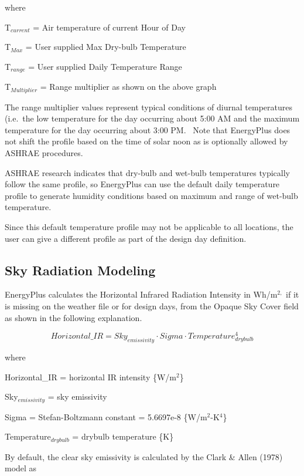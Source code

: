 where

T\(_{current}\) = Air temperature of current Hour of Day

T\(_{Max}\) = User supplied Max Dry-bulb Temperature

T\(_{range}\) = User supplied Daily Temperature Range

T\(_{Multiplier}\) = Range multiplier as shown on the above graph

The range multiplier values represent typical conditions of diurnal temperatures (i.e.~the low temperature for the day occurring about 5:00 AM and the maximum temperature for the day occurring about 3:00 PM.~ Note that EnergyPlus does not shift the profile based on the time of solar noon as is optionally allowed by ASHRAE procedures.

ASHRAE research indicates that dry-bulb and wet-bulb temperatures typically follow the same profile, so EnergyPlus can use the default daily temperature profile to generate humidity conditions based on maximum and range of wet-bulb temperature.

Since this default temperature profile may not be applicable to all locations, the user can give a different profile as part of the design day definition.

\subsection{Sky Radiation Modeling}\label{sky-radiation-modeling}

EnergyPlus calculates the Horizontal Infrared Radiation Intensity in Wh/m\(^{2,}\) if it is missing on the weather file or for design days, from the Opaque Sky Cover field as shown in the following explanation.

\begin{equation}
Horizontal\_IR = Sk{y_{emissivity}}\cdot Sigma\cdot Temperature_{drybulb}^4
\end{equation}

where

Horizontal\_IR = horizontal IR intensity \{W/m\(^{2}\)\}

Sky\(_{emissivity}\) = sky emissivity

Sigma = Stefan-Boltzmann constant = 5.6697e-8 \{W/m\(^{2}\)-K\(^{4}\)\}

Temperature\(_{drybulb}\) = drybulb temperature \{K\}

By default, the clear sky emissivity is calculated by the Clark \& Allen (1978) model as

